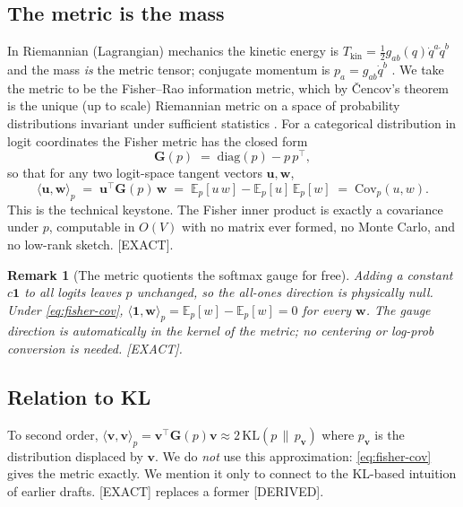 \documentclass[11pt]{article}
\newtheorem{remark}{Remark}
\newcommand{\KL}{\mathrm{KL}}
\newcommand{\Cov}{\mathrm{Cov}}
\begin{document}
\subsection{The metric is the mass}
In Riemannian (Lagrangian) mechanics the kinetic energy is $T_{\text{kin}}=\tfrac12 g_{ab}(q)\dot q^a \dot q^b$ and the mass \emph{is} the metric tensor; conjugate momentum is $p_a = g_{ab}\dot q^b$ \cite{arnold}. We take the metric to be the Fisher--Rao information metric, which by \v{C}encov's theorem is the unique (up to scale) Riemannian metric on a space of probability distributions invariant under sufficient statistics \cite{cencov,amari}. For a categorical distribution in logit coordinates the Fisher metric has the closed form
\begin{equation}
  \bm{G}(p) \;=\; \mathrm{diag}(p) - p\,p^{\top},
\end{equation}
so that for any two logit-space tangent vectors $\bm{u},\bm{w}$,
\begin{equation}
  \boxed{\;\langle \bm{u},\bm{w}\rangle_{p}
  \;=\; \bm{u}^{\top}\bm{G}(p)\,\bm{w}
  \;=\; \mathbb{E}_{p}[u\,w] - \mathbb{E}_{p}[u]\,\mathbb{E}_{p}[w]
  \;=\; \Cov_{p}(u,w).\;}
  \label{eq:fisher-cov}
\end{equation}
This is the technical keystone. The Fisher inner product is exactly a covariance under $p$, computable in $O(V)$ with no matrix ever formed, no Monte Carlo, and no low-rank sketch. \textsf{[EXACT]}.

\begin{remark}[The metric quotients the softmax gauge for free]
Adding a constant $c\bm{1}$ to all logits leaves $p$ unchanged, so the all-ones direction is physically null. Under \eqref{eq:fisher-cov}, $\langle \bm{1},\bm{w}\rangle_p = \mathbb{E}_p[w]-\mathbb{E}_p[w]=0$ for every $\bm{w}$. The gauge direction is automatically in the kernel of the metric; no centering or log-prob conversion is needed. \textsf{[EXACT]}.
\end{remark}

\subsection{Relation to KL}
To second order, $\langle \bm{v},\bm{v}\rangle_p = \bm{v}^\top \bm{G}(p)\bm{v} \approx 2\,\KL(p \,\|\, p_{\bm{v}})$ where $p_{\bm{v}}$ is the distribution displaced by $\bm{v}$. We do \emph{not} use this approximation: \eqref{eq:fisher-cov} gives the metric exactly. We mention it only to connect to the KL-based intuition of earlier drafts. \textsf{[EXACT]} replaces a former \textsf{[DERIVED]}.
\end{document}

